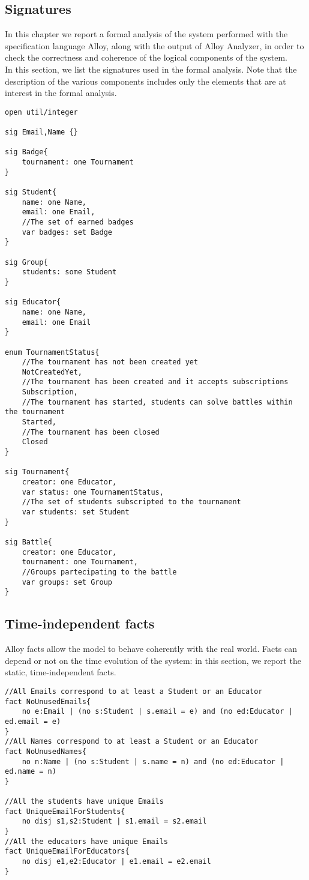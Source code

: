 \subsection{Signatures}
In this chapter we report a formal analysis of the system performed with the specification language Alloy, along with the output of Alloy Analyzer, in order to check the correctness and coherence of the logical components of the system.\\
In this section, we list the signatures used in the formal analysis. Note that the description of the various components includes only the elements that are at interest in the formal analysis.

\begin{verbatim}
open util/integer

sig Email,Name {}

sig Badge{
    tournament: one Tournament
}

sig Student{
    name: one Name,
    email: one Email,
    //The set of earned badges
    var badges: set Badge
}

sig Group{
    students: some Student
}

sig Educator{
    name: one Name,
    email: one Email
}

enum TournamentStatus{
    //The tournament has not been created yet
    NotCreatedYet,
    //The tournament has been created and it accepts subscriptions
    Subscription,
    //The tournament has started, students can solve battles within the tournament
    Started,
    //The tournament has been closed
    Closed
}

sig Tournament{
    creator: one Educator,
    var status: one TournamentStatus,
    //The set of students subscripted to the tournament
    var students: set Student
}

sig Battle{
    creator: one Educator,
    tournament: one Tournament,
    //Groups partecipating to the battle
    var groups: set Group
}
\end{verbatim}

\subsection{Time-independent facts}
Alloy facts allow the model to behave coherently with the real world. Facts can depend or not on the time evolution of the system: in this section, we report the static, time-independent facts.

\begin{verbatim}
//All Emails correspond to at least a Student or an Educator
fact NoUnusedEmails{
    no e:Email | (no s:Student | s.email = e) and (no ed:Educator | ed.email = e)
}
//All Names correspond to at least a Student or an Educator
fact NoUnusedNames{
    no n:Name | (no s:Student | s.name = n) and (no ed:Educator | ed.name = n)
}

//All the students have unique Emails
fact UniqueEmailForStudents{
    no disj s1,s2:Student | s1.email = s2.email
}
//All the educators have unique Emails
fact UniqueEmailForEducators{
    no disj e1,e2:Educator | e1.email = e2.email
}
\end{verbatim}

